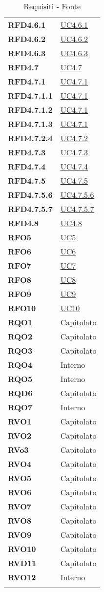 \begin{longtable}[H]{|>{\centering\bfseries}m{8cm} | >{\centering\arraybackslash}m{8cm} |}
    RFD4.6.1 & \hyperref[par:uc4.6.1]{UC4.6.1} \\
    RFD4.6.2 & \hyperref[par:uc4.6.2]{UC4.6.2} \\
    RFD4.6.3 & \hyperref[par:uc4.6.3]{UC4.6.3} \\
    RFD4.7 & \hyperref[ssub:uc4.7]{UC4.7} \\
    RFD4.7.1 & \hyperref[par:uc4.7.1]{UC4.7.1} \\
    RFD4.7.1.1 & \hyperref[par:uc4.7.1]{UC4.7.1} \\
    RFD4.7.1.2 & \hyperref[par:uc4.7.1]{UC4.7.1} \\
    RFD4.7.1.3 & \hyperref[par:uc4.7.1]{UC4.7.1} \\
    RFD4.7.2.4 & \hyperref[par:uc4.7.2]{UC4.7.2} \\
    RFD4.7.3 & \hyperref[par:uc4.7.3]{UC4.7.3} \\
    RFD4.7.4 & \hyperref[par:uc4.7.4]{UC4.7.4} \\
    RFD4.7.5 & \hyperref[par:uc4.7.5]{UC4.7.5} \\
    RFD4.7.5.6 & \hyperref[spar:uc4.7.5.6]{UC4.7.5.6} \\
    RFD4.7.5.7 & \hyperref[spar:uc4.7.5.7]{UC4.7.5.7} \\
    RFD4.8 & \hyperref[ssub:uc4.8]{UC4.8} \\
    RFO5 & \hyperref[sub:uc5]{UC5} \\
    RFO6 & \hyperref[sub:uc6]{UC6} \\
    RFO7 & \hyperref[sub:uc7]{UC7} \\
    RFO8 & \hyperref[sub:uc8]{UC8} \\
    RFO9 & \hyperref[sub:uc9]{UC9} \\
    RFO10 & \hyperref[sub:uc10]{UC10} \\
    RQO1 & Capitolato \\
    RQO2 & Capitolato \\
    RQO3 & Capitolato \\
    RQO4 & Interno \\
    RQO5 & Interno \\
    RQD6 & Capitolato \\
    RQO7 & Interno \\
    RVO1 & Capitolato \\
    RVO2 & Capitolato \\
    RVo3 & Capitolato \\
    RVO4 & Capitolato \\
    RVO5 & Capitolato \\
    RVO6 & Capitolato \\
    RVO7 & Capitolato \\
    RVO8 & Capitolato \\
    RVO9 & Capitolato \\
    RVO10 & Capitolato \\
    RVD11 & Capitolato \\
    RVO12 & Interno\\
    \hline
    \rowcolor{white}
    \caption{Requisiti - Fonte}%
    \label{tab:requisiti_fonte}
\end{longtable}
